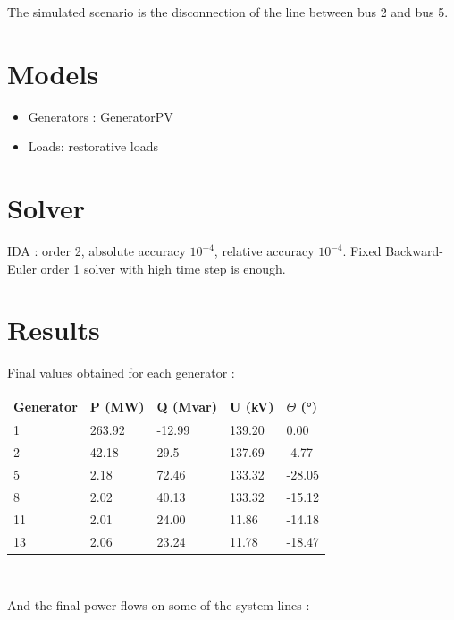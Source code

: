 \documentclass[a4paper, 12pt]{report}
\begin{document}
The simulated scenario is the disconnection of the line between bus 2 and bus 5.

\section{Models}

\begin{itemize}
  \item Generators : GeneratorPV
  \item Loads: restorative loads
\end{itemize}

\section{Solver}

IDA : order 2, absolute accuracy $10^{-4}$, relative accuracy $10^{-4}$. Fixed Backward-Euler order 1 solver with high time step is enough.

\section{Results}

Final values obtained for each generator : \\

\begin{tabular}{ | m{2cm} | m{2cm}| m{2cm} | m{2cm} | m{2cm} | }
  \hline
  \textbf{Generator} & \textbf{P (MW)} & \textbf{Q (Mvar)} & \textbf{U (kV)} & \textbf{$\Theta$ (°)} \\
  \hline
  1 & 263.92 & -12.99 & 139.20 & 0.00 \\
  \hline
  2 & 42.18 & 29.5 & 137.69 & -4.77 \\
  \hline
  5 & 2.18 & 72.46 & 133.32 & -28.05 \\
  \hline
  8 & 2.02 & 40.13 & 133.32 & -15.12 \\
  \hline
  11 & 2.01 & 24.00 & 11.86 & -14.18 \\
  \hline
  13 & 2.06 & 23.24 & 11.78 & -18.47 \\
  \hline
\end{tabular} \\

\pagebreak

And the final power flows on some of the system lines : \\
\end{document}
